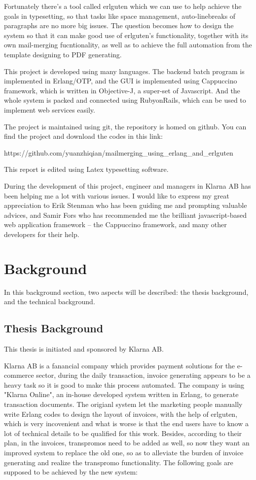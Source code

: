 \documentclass[12pt,twoside,a4paper]{report}
\begin{document}
  Fortunately there's a tool called erlguten which we can use to help achieve the goals in typesetting, so that tasks like space management, auto-linebreaks of paragraphs are no more big issues. The question becomes how to design the system so that it can make good use of erlguten's functionality, together with its own mail-merging fucntionality, as well as to achieve the full automation from the template designing to PDF generating.

  This project is developed using many languages. The backend batch program is implemented in Erlang/OTP, and the GUI is implemented using Cappuccino framework, which is written in Objective-J, a super-set of Javascript. And the whole system is packed and connected using RubyonRails, which can be used to implement web services easily. 

  The project is maintained using git, the repository is homed on github. You can find the project and download the codes in this link: 

  https://github.com/yuanzhiqian/mailmerging\_using\_erlang\_and\_erlguten

  This report is edited using Latex typesetting software.

  During the development of this project, engineer and managers in Klarna AB has been helping me a lot with various issues. I would like to express my great appreciation to Erik Stenman who has been guiding me and prompting valuable advices, and Samir Fors who has recommended me the brilliant javascript-based web application framework -- the Cappuccino framework, and many other developers for their help. 

\section{Background}
  In this background section, two aspects will be described: the thesis background, and the technical background.
\subsection{Thesis Background}
  This thesis is initiated and sponsored by Klarna AB.

  Klarna AB is a fanancial company which provides payment solutions for the e-commerce sector, during the daily transaction, invoice generating appears to be a heavy task so it is good to make this process automated. The company is using "Klarna Online", an in-house developed system written in Erlang, to generate transaction documents. The origianl system let the marketing people manually write Erlang codes to design the layout of invoices, with the help of erlguten, which is very incovenient and what is worse is that the end users have to know a lot of technical details to be qualified for this work. Besides, according to their plan, in the invoices, transpromos\cite{transpromo} need to be added as well, so now they want an improved system to replace the old one, so as to alleviate the burden of invoice generating and realize the transpromo functionality. The following goals are supposed to be achieved by the new system:
\end{document}
